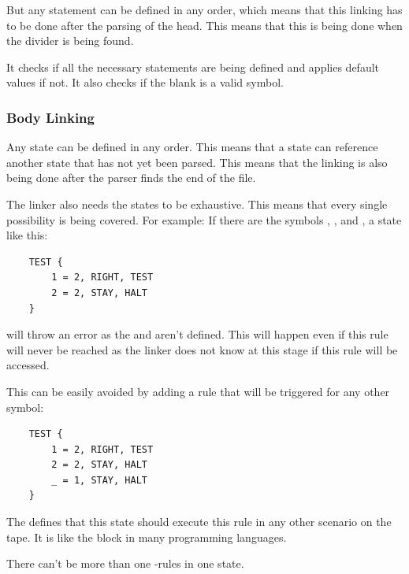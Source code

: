 But any statement can be defined in any order, which means that this linking has to be done after
the parsing of the head. This means that this is being done when the divider is being found.

It checks if all the necessary statements are being defined and applies default values if not.
It also checks if the blank is a valid symbol.

\subsubsection{Body Linking}
Any state can be defined in any order. This means that a state can reference another state that has not yet been parsed.
This means that the linking is also being done after the parser finds the end
of the file.

The linker also needs the states to be exhaustive. This means that every single possibility is being covered.
For example: If there are the symbols , ,  and , a state like this:
\begin{verbatim}
    TEST {
        1 = 2, RIGHT, TEST
        2 = 2, STAY, HALT
    }
\end{verbatim}
will throw an error as the  and  aren't defined. This will happen even if this rule will never be reached
as the linker does not know at this stage if this rule will be accessed.

This can be easily avoided by adding a rule that will be triggered for any other symbol:
\begin{verbatim}
    TEST {
        1 = 2, RIGHT, TEST
        2 = 2, STAY, HALT
        _ = 1, STAY, HALT
    }
\end{verbatim}

The \code{\_} defines that this state should execute this rule in any other scenario on the tape. 
It is like the  block in many programming languages.

There can't be more than one \code{\_}-rules in one state.
